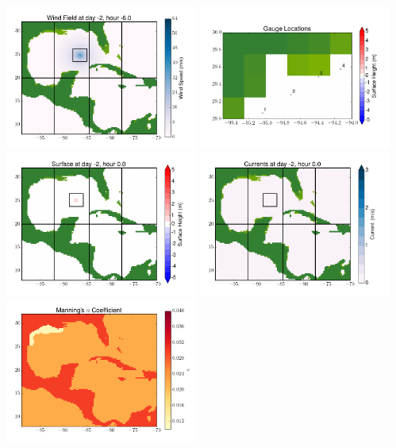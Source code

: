 \documentclass[11pt]{article}
\begin{document}
\vskip 10pt 
\includegraphics[width=0.475\textwidth]{frame0003fig9.png}
\includegraphics[width=0.475\textwidth]{frame0003fig10.png}
\vskip 10pt 
\includegraphics[width=0.475\textwidth]{frame0004fig1.png}
\includegraphics[width=0.475\textwidth]{frame0004fig2.png}
\vskip 10pt 
\includegraphics[width=0.475\textwidth]{frame0004fig3.png}
\end{document}
